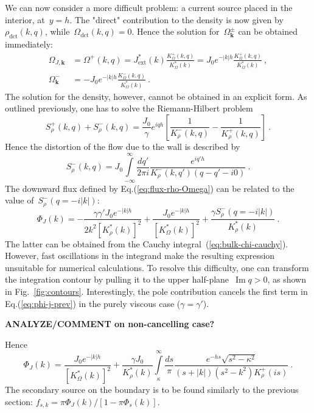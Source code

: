 \documentclass[preprint,aps,eqsecnum, prb]{revtex4-1}
\newcommand{\fplus}[1]{{#1}^{+}}
\newcommand{\fminus}[1]{{#1}^{-}}
\newcommand{\fplusminus}[1]{{#1}^{\pm}}
\renewcommand{\Im}{\mathop{\mathrm{Im}}\nolimits}
\newcommand{\dct}[1]{{#1}_\mathrm{dct}}
\begin{document}
We can now consider a more difficult problem: a current source placed
in the interior, at~$y = h$. The "direct" contribution to the density is now given
by~$\dct{\rho}(k, q)$, while~$\dct{\Omega}(k, q) = 0$. Hence the solution
for~$\fplusminus{\Omega}_{\bm k}$ can be obtained immediately:
\begin{align}
\Omega_{J, {\bm k}} &=  \fplus{\Omega}(k, q)
= J_\mathrm{ext}^\ast(k) \frac{\fplus{K}_\Omega(k, q)}{K_\Omega^\ast(k)}
= J_0 e^{-|k|h} \frac{\fplus{K}_\Omega(k, q)}{K_\Omega^\ast(k)}
\ ,
\\
\fminus{\Omega}_{\bm k}
&= - J_0 e^{-|k|h} \frac{\fminus{K}_\Omega(k, q)}{K_\Omega^\ast(k)}
\ .
\end{align}
The solution for the density, however, cannot be obtained in an explicit form.
As outlined previously, one has to solve the Riemann-Hilbert problem
\begin{equation}
  \fplus{S}_\rho(k, q) + \fminus{S}_\rho(k, q) = \frac{J_0}{\gamma} e^{iqh}
  \left[\frac{1}{\fminus{K}_\rho(k, q)} -
  \frac{1}{\fplus{K}_\rho(k, q)} \right]
  \ .
\end{equation}
Hence the distortion of the flow due to the wall is described by
\begin{equation}
  \label{eq:bulk-chi-cauchy}
  \fminus{S}_\rho(k, q) = J_0 \int\limits_{-\infty}^{\infty}
  \frac{dq'}{2\pi i} \frac{e^{iq'h}}{\fminus{K}_\rho(k, q') (q - q' - i0)}
  \ .
\end{equation}
The downward flux defined by Eq.(\ref{eq:flux-rho-Omega}) can be related
to the value of~$\fminus{S}_\rho(q = -i|k|)$:
\begin{equation}
  \label{eq:phi-j-prev}
\Phi_J(k) = - \frac{\gamma \gamma' J_0 e^{-|k|h}}{2k^2 \left[K_\rho^\ast(k)\right]^2}
+ \frac{J_0 e^{-|k|h}}{\left[K_\Omega^\ast(k)\right]^2}
+ \frac{\gamma \fminus{S}_\rho(q=-i|k|)}{K_\rho^\ast(k)}
\ .
\end{equation}
The latter can be obtained from the Cauchy integral~(\ref{eq:bulk-chi-cauchy}).
However, fast oscillations in the integrand make the resulting expression
unsuitable for numerical calculations. To resolve this difficulty, one can
transform the integration contour by pulling it to
the upper half-plane~$\Im q > 0$, as shown in Fig.~\ref{fig:contours}.
Interestingly, the pole contribution cancels the first term in Eq.(\ref{eq:phi-j-prev}) in the purely viscous case ($\gamma = \gamma'$).

{\bf ANALYZE/COMMENT on non-cancelling case?}

Hence
\begin{equation}
\Phi_J(k) =
 \frac{J_0 e^{-|k|h}}{\left[K_\Omega^\ast(k)\right]^2}
 + \frac{\gamma J_0}{K_\rho^\ast(k)}
   \int\limits_{\kappa}^{\infty} \frac{ds}{\pi}
   \frac{e^{-hs} \sqrt{s^2 - \kappa^2}}{(s + |k|) (s^2 - k^2) \fplus{K}_\rho(is)}
   \ .
\end{equation}
The secondary source on the boundary is to be found similarly to the previous
section: $f_{s, k} = \pi \Phi_J(k)/\left[1 - \pi \Phi_s(k)\right]$.
\end{document}

